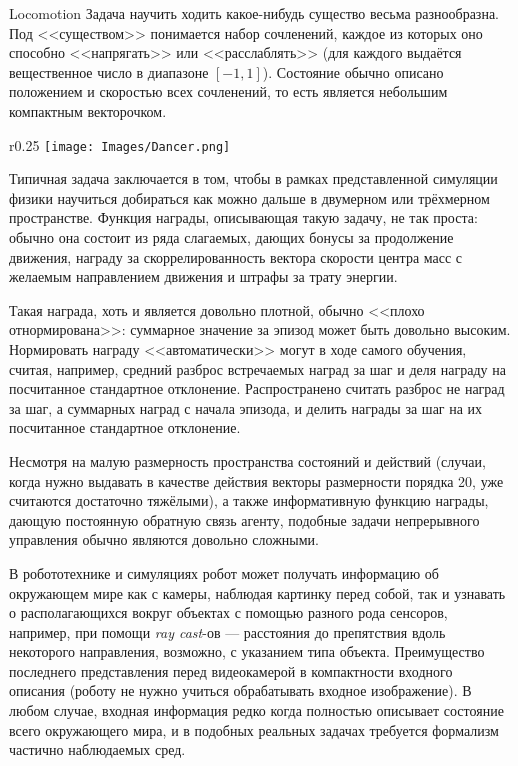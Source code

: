 \begin{exampleBox}[label=ex:locomotion]{Locomotion}
Задача научить ходить какое-нибудь существо весьма разнообразна. Под <<существом>> понимается набор сочленений, каждое из которых оно способно <<напрягать>> или <<расслаблять>> (для каждого выдаётся вещественное число в диапазоне $[-1, 1]$). Состояние обычно описано положением и скоростью всех сочленений, то есть является небольшим компактным векторочком. 

\begin{wrapfigure}{r}{0.25\textwidth}
\centering
\vspace{-0.3cm}
\texttt{[image: Images/Dancer.png]}
\vspace{-0.8cm}
\end{wrapfigure}

Типичная задача заключается в том, чтобы в рамках представленной симуляции физики научиться добираться как можно дальше в двумерном или трёхмерном пространстве. Функция награды, описывающая такую задачу, не так проста: обычно она состоит из ряда слагаемых, дающих бонусы за продолжение движения, награду за скоррелированность вектора скорости центра масс с желаемым направлением движения и штрафы за трату энергии.

\begin{remark}
Такая награда, хоть и является довольно плотной, обычно <<плохо отнормирована>>: суммарное значение за эпизод может быть довольно высоким. Нормировать награду <<автоматически>> могут в ходе самого обучения, считая, например, средний разброс встречаемых наград за шаг и деля награду на посчитанное стандартное отклонение. Распространено считать разброс не наград за шаг, а суммарных наград с начала эпизода, и делить награды за шаг на их посчитанное стандартное отклонение.
\end{remark}

Несмотря на малую размерность пространства состояний и действий (случаи, когда нужно выдавать в качестве действия векторы размерности порядка 20, уже считаются достаточно тяжёлыми), а также информативную функцию награды, дающую постоянную обратную связь агенту, подобные задачи непрерывного управления обычно являются довольно сложными.
\end{exampleBox}

\begin{example}
В робототехнике и симуляциях робот может получать информацию об окружающем мире как с камеры, наблюдая картинку перед собой, так и узнавать о располагающихся вокруг объектах с помощью разного рода сенсоров, например, при помощи \emph{ray cast}-ов --- расстояния до препятствия вдоль некоторого направления, возможно, с указанием типа объекта. Преимущество последнего представления перед видеокамерой в компактности входного описания (роботу не нужно учиться обрабатывать входное изображение). В любом случае, входная информация редко когда полностью описывает состояние всего окружающего мира, и в подобных реальных задачах требуется формализм частично наблюдаемых сред. 
\end{example}
